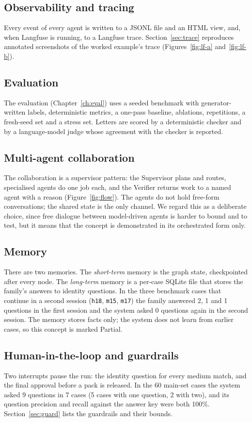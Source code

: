 \subsection{Observability and tracing}
Every event of every agent is written to a JSONL file and an HTML view, and, when Langfuse is running, to a Langfuse trace. Section~\ref{sec:trace} reproduces annotated screenshots of the worked example's trace (Figures~\ref{fig:lf-a} and~\ref{fig:lf-b}).

\subsection{Evaluation}
The evaluation (Chapter~\ref{ch:eval}) uses a seeded benchmark with generator-written labels, deterministic metrics, a one-pass baseline, ablations, repetitions, a fresh-seed set and a stress set. Letters are scored by a deterministic checker and by a language-model judge whose agreement with the checker is reported.

\subsection{Multi-agent collaboration}
The collaboration is a supervisor pattern: the Supervisor plans and routes, specialised agents do one job each, and the Verifier returns work to a named agent with a reason (Figure~\ref{fig:flow}). The agents do not hold free-form conversations; the shared state is the only channel. We regard this as a deliberate choice, since free dialogue between model-driven agents is harder to bound and to test, but it means that the concept is demonstrated in its orchestrated form only.

\subsection{Memory}\label{sec:memory}
There are two memories. The \emph{short-term} memory is the graph state, checkpointed after every node. The \emph{long-term} memory is a per-case SQLite file that stores the family's answers to identity questions. In the three benchmark cases that continue in a second session (\texttt{h18}, \texttt{m15}, \texttt{m17}) the family answered 2, 1 and 1 questions in the first session and the system asked 0 questions again in the second session. The memory stores facts only; the system does not learn from earlier cases, so this concept is marked Partial.

\subsection{Human-in-the-loop and guardrails}\label{sec:hitl}
Two interrupts pause the run: the identity question for every medium match, and the final approval before a pack is released. In the 60 main-set cases the system asked 9 questions in 7 cases (5 cases with one question, 2 with two), and its question precision and recall against the answer key were both 100\%. Section~\ref{sec:guard} lists the guardrails and their bounds.

